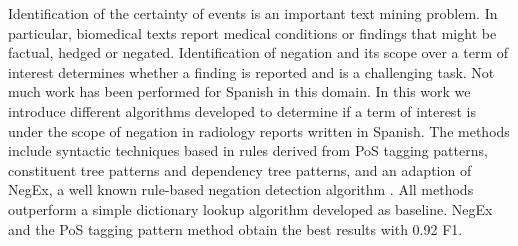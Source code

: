 Identification of the certainty of events is an important text mining problem. In particular, biomedical texts report medical conditions or findings that might be factual, hedged or negated. Identification of negation and its scope over a term of interest determines whether a finding is reported and is a challenging task. Not much work has been performed for Spanish in this domain. In this work we introduce different algorithms developed to determine if a term of interest is under the scope of negation in radiology reports written in Spanish. The methods include syntactic techniques based in rules derived from PoS tagging patterns,             constituent tree patterns and dependency tree patterns, and an adaption of NegEx, a well known rule-based negation detection algorithm \cite{Chapman2001}. All methods outperform a simple dictionary lookup algorithm developed as baseline. NegEx and the PoS tagging pattern method obtain the best results with 0.92 F1.
